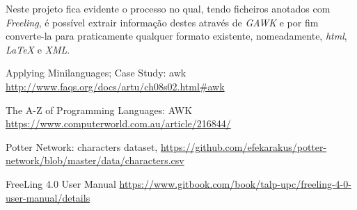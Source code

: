 \documentclass[a4paper]{article}
\begin{document}
Neste projeto fica evidente o processo no qual, tendo ficheiros anotados com \textit{Freeling}, é possível extrair informação destes através de \textit{GAWK} e por fim converte-la para praticamente qualquer formato existente, nomeadamente, \textit{html}, \textit{\LaTeX} e \textit{XML}.


\newpage 

\begin{thebibliography}{3}

Applying Minilanguages; Case Study: awk  
\hyperref[Awk]{http://www.faqs.org/docs/artu/ch08s02.html\#awk}

The A-Z of Programming Languages: AWK  
\hyperref[Aho]{https://www.computerworld.com.au/article/216844/}

Potter Network: characters dataset,
\hyperref[dataset]{https://github.com/efekarakus/potter-network/blob/master/data/characters.csv}

FreeLing 4.0 User Manual
\hyperref[Freeling]{https://www.gitbook.com/book/talp-upc/freeling-4-0-user-manual/details}

\end{thebibliography}
\end{document}
